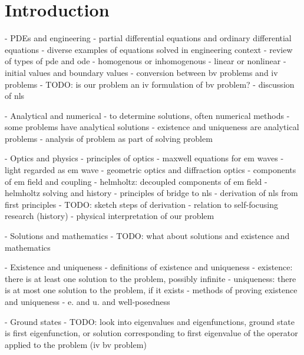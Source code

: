 \section{Introduction}
\begin{markdown}
- PDEs and engineering
  - partial differential equations and ordinary differential equations
  - diverse examples of equations solved in engineering context
  - review of types of pde and ode
    - homogenous or inhomogenous
    - linear or nonlinear
    - initial values and boundary values
      - conversion between bv problems and iv problems
      - TODO: is our problem an iv formulation of bv problem?
  - discussion of nls

- Analytical and numerical
  - to determine solutions, often numerical methods
  - some problems have analytical solutions
  - existence and uniqueness are analytical problems
  - analysis of problem as part of solving problem

- Optics and physics
  - principles of optics
    - maxwell equations for em waves
    - light regarded as em wave
    - geometric optics and diffraction optics
    - components of em field and coupling
    - helmholtz: decoupled components of em field
    - helmholtz solving and history
    - principles of bridge to nls
  - derivation of nls from first principles
    - TODO: sketch steps of derivation
  - relation to self-focusing research (history)
  - physical interpretation of our problem

- Solutions and mathematics
  - TODO: what about solutions and existence and mathematics

- Existence and uniqueness
  - definitions of existence and uniqueness
    - existence: there is at least one solution to the problem, possibly infinite
    - uniqueness: there is at most one solution to the problem, if it exists
  - methods of proving existence and uniqueness
  - e. and u. and well-posedness

- Ground states
  - TODO: look into eigenvalues and eigenfunctions, ground state is first eigenfunction, or solution corresponding to first eigenvalue of the operator applied to the problem (iv bv problem)
\end{markdown}


